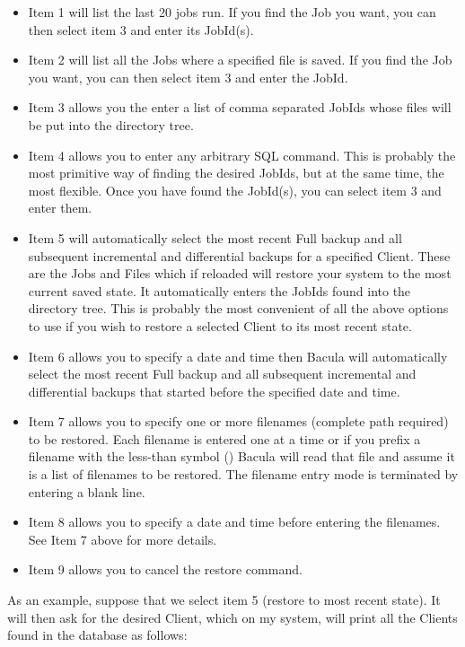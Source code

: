 \begin{itemize}
\item Item 1 will list the last 20 jobs run. If you find the  Job you want,
   you can then select item 3 and enter its JobId(s). 
\item Item 2 will list all the Jobs where a specified file is saved.  If you
   find the Job you want, you can then select item 3 and  enter the JobId. 
\item Item 3 allows you the enter a list of comma separated JobIds whose 
   files will be put into the directory tree. 
\item Item 4 allows you to enter any arbitrary SQL command. This is  probably
   the most primitive way of finding the desired JobIds,  but at the same time,
   the most flexible.  Once you have found the JobId(s), you can select item 3
and enter  them.  
\item Item 5 will automatically select the most recent Full backup and all 
   subsequent incremental and differential backups for a specified  Client. These
   are the Jobs and Files which if reloaded will  restore your system to the most
current saved state. It  automatically enters the JobIds found into the 
directory tree. This is probably the most convenient of all the  above options
to use if you wish to restore a selected Client to  its most recent state.  
\item Item 6 allows you to specify a date and time then Bacula  will
   automatically select the most recent Full backup and all  subsequent
   incremental and differential backups that started  before the specified date
and time.  
\item Item 7 allows you to specify one or more filenames  (complete path
   required) to be restored. Each filename  is entered one at a time or if you
   prefix a filename  with the less-than symbol (\lt{}) Bacula will read that 
file and assume it is a list of filenames to be restored.  The filename entry
mode is terminated by entering a  blank line.  
\item Item 8 allows you to specify a date and time before  entering the
   filenames. See Item 7 above for more  details.  
\item Item 9 allows you to cancel the restore command.  
   \end{itemize}

As an example, suppose that we select item 5 (restore to most recent state).
It will then ask for the desired Client, which on my system, will print all
the Clients found in the database as follows:  

